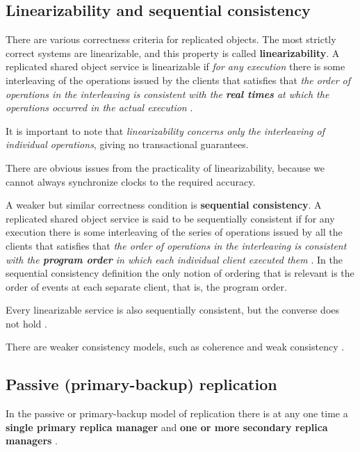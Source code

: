 \documentclass[12pt, oneside]{book}
\begin{document}
\subsection{Linearizability and sequential consistency}

There are various correctness criteria for replicated objects.
The most strictly correct systems are linearizable, and this property is called \textbf{linearizability}.
A replicated shared object service is linearizable if \textit{for any execution} there is some interleaving of the operations issued by the clients that satisfies that \textit{the order of operations in the interleaving is consistent with the \textbf{real times} at which the operations occurred in the actual execution} \cite[p.~777]{distributed-systems-coulouris-2013}.

It is important to note that \textit{linearizability concerns only the interleaving of individual operations}, giving no transactional guarantees.

There are obvious issues from the practicality of linearizability, because we cannot always synchronize clocks to the required accuracy.

A weaker but similar correctness condition is \textbf{sequential consistency}.
A replicated shared object service is said to be sequentially consistent if for any execution there is some interleaving of the series of operations issued by all the clients that satisfies that \textit{the order of operations in the interleaving is consistent with the \textbf{program order} in which each individual client executed them} \cite[p.~777]{distributed-systems-coulouris-2013}.
In the sequential consistency definition the only notion of ordering that is relevant is the order of events at each separate client, that is, the program order.

Every linearizable service is also sequentially consistent, but the converse does not hold \cite[p.~777]{distributed-systems-coulouris-2013}.

There are weaker consistency models, such as coherence \cite[p.~759]{distributed-systems-coulouris-2009} and weak consistency \cite[p.~760]{distributed-systems-coulouris-2009}.

\subsection{Passive (primary-backup) replication}

In the passive or primary-backup model of replication there is at any one time a \textbf{single primary replica manager} and \textbf{one or more secondary replica managers} \cite[p.~778]{distributed-systems-coulouris-2013}.
\end{document}
